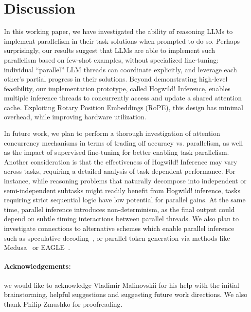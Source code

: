 \documentclass{article}
\theoremstyle{plain}
\theoremstyle{definition}
\theoremstyle{remark}
\begin{document}




\section{Discussion}\label{sect:discussion}

In this working paper, we have investigated the ability of reasoning LLMs to implement parallelism in their task solutions when prompted to do so. 
Perhaps surprisingly, our results suggest that LLMs are able to implement such parallelism based on few-shot examples, without specialized fine-tuning: individual ``parallel'' LLM threads can coordinate explicitly, and leverage each other's partial progress in their solutions. 
Beyond demonstrating high-level feasibility, our implementation prototype, called Hogwild! Inference, enables multiple inference threads to concurrently access and update a shared attention cache. Exploiting Rotary Position Embeddings (RoPE), this design has minimal overhead, while improving hardware utilization. 

In future work, we plan to perform a thorough investigation of attention concurrency mechanisms in terms of trading off accuracy vs. parallelism, as well as the impact of supervised fine-tuning for better enabling task parallelism. 
Another consideration is that the effectiveness of Hogwild! Inference may vary  across tasks, requiring a detailed analysis of task-dependent performance. For instance, while reasoning problems that naturally decompose into independent or semi-independent subtasks might readily benefit from Hogwild! inference, tasks requiring strict sequential logic have low potential for parallel gains.
At the same time, parallel inference introduces non-determinism, as the final output could depend on subtle timing interactions between parallel threads. 
We also plan to investigate connections to alternative schemes which enable parallel inference such as speculative decoding~\citep{leviathan2023fast}, or parallel token generation via methods like Medusa~\citep{cai2024medusa} or EAGLE~\citep{li2024eagle}. 


\paragraph{Acknowledgements:} we would like to acknowledge Vladimir Malinovskii for his help with the initial brainstorming, helpful suggestions and suggesting future work directions. We also thank Philip Zmushko for proofreading.







\newpage
\appendix

\end{document}

